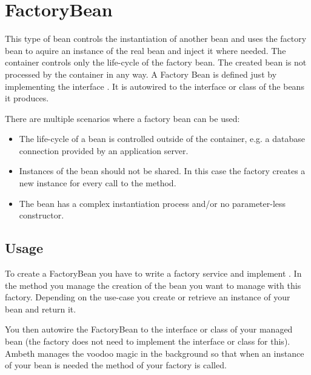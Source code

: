 \section{FactoryBean}
\label{feature:FactoryBean}
\ClearAPI

This type of bean controls the instantiation of another bean and \AMBETH{} uses the factory bean to aquire an instance of the real bean and inject it where needed. The container controls only the life-cycle of the factory bean. The created bean is not processed by the container in any way. A Factory Bean is defined just by implementing the interface . It is autowired to the interface or class of the beans it produces.

There are multiple scenarios where a factory bean can be used:

\begin{itemize}
	\item The life-cycle of a bean is controlled outside of the container, e.g. a database connection provided by an application server.
	\item Instances of the bean should not be shared. In this case the factory creates a new instance for every call to the  method.
	\item The bean has a complex instantiation process and/or no parameter-less constructor.
\end{itemize}

\subsection{Usage}

To create a FactoryBean you have to write a factory service and implement . In the  method you manage the creation of the bean you want to manage with this factory. Depending on the use-case you create or retrieve an instance of your bean and return it.

You then autowire the FactoryBean to the interface or class of your managed bean (the factory does not need to implement the interface or class for this). Ambeth manages the voodoo magic in the background so that when an instance of your bean is needed the  method of your factory is called.